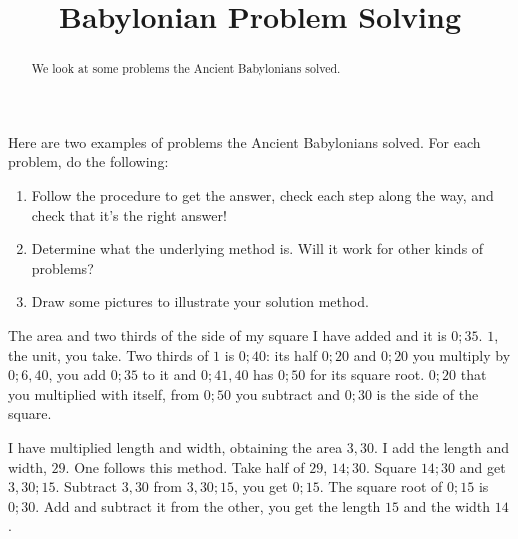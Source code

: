 \documentclass[nooutcomes]{ximera}
\title{Babylonian Problem Solving}
\begin{document}
\begin{abstract}
    We look at some problems the Ancient Babylonians solved.
\end{abstract}
\maketitle

Here are two examples of problems the Ancient Babylonians solved. For each problem, do the following:
\begin{enumerate}
	\item Follow the procedure to get the answer, check each step along the way, and check that it's the right answer!
	\item Determine what the underlying method is. Will it work for other kinds of problems?
	\item Draw some pictures to illustrate your solution method.
\end{enumerate}

\begin{problem}
The area and two thirds of the side of my square I have added and it is $0;35$. $1$, the unit, you take. Two thirds of $1$ is $0;40$: its half $0;20$ and $0;20$ you multiply by $0;6,40$, you add $0;35$ to it and $0;41,40$ has $0;50$ for its square root. $0;20$ that you multiplied with itself, from $0;50$ you subtract and $0;30$ is the side of the square.
\end{problem}

\begin{problem}
I have multiplied length and width, obtaining the area $3,30$. I add the length and width, $29$. One follows this method. Take half of $29$, $14;30$. Square $14;30$ and get $3,30;15$. Subtract $3,30$ from $3,30;15$, you get $0;15$. The square root of $0;15$ is $0;30$. Add and subtract it from the other, you get the length $15$ and the width $14$.
\end{problem}
\end{document}

